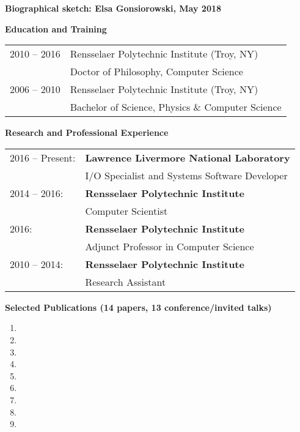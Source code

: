 \documentclass[times,11pt]{article}    %
\begin{document}
\begin{center}
\textbf{\sffamily\large Biographical sketch: Elsa Gonsiorowski, May 2018}
\end{center}

\vskip 3pt
\textbf{\sffamily Education and Training}
\vskip 3pt

\begin{tabular}{ll}
\\
2010 -- 2016 & Rensselaer Polytechnic Institute (Troy, NY)\\
             & Doctor of Philosophy, Computer Science\\
2006 -- 2010 & Rensselaer Polytechnic Institute (Troy, NY)\\
             & Bachelor of Science, Physics \& Computer Science\\
\end{tabular}

\vskip 3pt
\textbf{\sffamily Research and Professional Experience}
\vskip 3pt

\begin{tabular}{ll}
2016 -- Present: &
\textbf{Lawrence Livermore National Laboratory}\\
 & I/O Specialist and Systems Software Developer \\

2014 -- 2016: &
\textbf{Rensselaer Polytechnic Institute}\\
 & Computer Scientist \\

2016: &
\textbf{Rensselaer Polytechnic Institute}\\
 & Adjunct Professor in Computer Science \\

2010 -- 2014: &
\textbf{Rensselaer Polytechnic Institute}\\
 & Research Assistant \\
\end{tabular}

\vskip 3pt
\textbf{\sffamily Selected Publications (14 papers, 13 conference/invited talks)}

\begin{enumerate}
\item {}
\item {}
\item {}
\item {}
\item {}
\item {}
\item {}
\item {}
\item {}
\end{enumerate}
\end{document}
